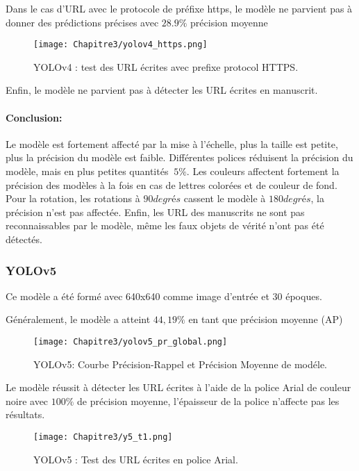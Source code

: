           Dans le cas d'URL avec le protocole de préfixe https, le modèle ne parvient pas à donner des prédictions précises avec $28.9\%$ précision moyenne
          \begin{figure}[H]
                    \centering
                    \texttt{[image: Chapitre3/yolov4\_https.png]}
                    \caption{YOLOv4 : test des URL écrites avec prefixe protocol HTTPS.}
                    \label{y4_https}
                    \end{figure}
               
          Enfin, le modèle ne parvient pas à détecter les URL écrites en manuscrit.
          \paragraph{Conclusion:} Le modèle est fortement affecté par la mise à l'échelle, plus la taille est petite, plus la précision du modèle est faible. Différentes polices réduisent la précision du modèle, mais en plus petites quantités $~ 5\%$. Les couleurs affectent fortement la précision des modèles à la fois en cas de lettres colorées et de couleur de fond. Pour la rotation, les rotations à $90 degrés$ cassent le modèle à $180 degrés$, la précision n'est pas affectée. Enfin, les URL des manuscrits ne sont pas reconnaissables par le modèle, même les faux objets de vérité n'ont pas été détectés.
               
          \subsubsection{YOLOv5}
          Ce modèle a été formé avec 640x640 comme image d'entrée et 30 époques.
               
          Généralement, le modèle a atteint $44,19\%$ en tant que précision moyenne (AP)
          \begin{figure}[H]
                    \centering
                    \texttt{[image: Chapitre3/yolov5\_pr\_global.png]}
                    \caption{YOLOv5: Courbe Précision-Rappel et Précision Moyenne de modéle.}
                    \label{y4_pr}
                    \end{figure}
               
               
          Le modèle réussit à détecter les URL écrites à l'aide de la police Arial de couleur noire avec $100\%$ de précision moyenne, l'épaisseur de la police n'affecte pas les résultats. 
          \begin{figure}[H]
                    \centering
                    \texttt{[image: Chapitre3/y5\_t1.png]}
                    \caption{YOLOv5 : Test des URL écrites en police Arial.}
                    \label{y5_t1}
                    \end{figure}


